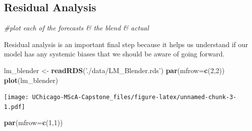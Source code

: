 \documentclass[12pt,oneside]{chicagocapstone}
\newenvironment{Shaded}{\begin{snugshade}}{\end{snugshade}}
\newcommand{\KeywordTok}[1]{\textcolor[rgb]{0.13,0.29,0.53}{\textbf{#1}}}
\newcommand{\DataTypeTok}[1]{\textcolor[rgb]{0.13,0.29,0.53}{#1}}
\newcommand{\DecValTok}[1]{\textcolor[rgb]{0.00,0.00,0.81}{#1}}
\newcommand{\StringTok}[1]{\textcolor[rgb]{0.31,0.60,0.02}{#1}}
\newcommand{\CommentTok}[1]{\textcolor[rgb]{0.56,0.35,0.01}{\textit{#1}}}
\newcommand{\OtherTok}[1]{\textcolor[rgb]{0.56,0.35,0.01}{#1}}
\newcommand{\OperatorTok}[1]{\textcolor[rgb]{0.81,0.36,0.00}{\textbf{#1}}}
\newcommand{\NormalTok}[1]{#1}
\begin{document}
\subsection*{Residual Analysis}\label{findings-Residual-Analysis}
\begin{Shaded}
\begin{Highlighting}[]
\CommentTok{#plot each of the forecasts & the blend & actual}
\end{Highlighting}
\end{Shaded}
Residual analysis is an important final step because it helps us
understand if our model has any systemic biases that we should be aware
of going forward.
\begin{Shaded}
\begin{Highlighting}[]
\NormalTok{lm_blender <-}\StringTok{ }\KeywordTok{readRDS}\NormalTok{(}\StringTok{'./data/LM_Blender.rds'}\NormalTok{)}
\KeywordTok{par}\NormalTok{(}\DataTypeTok{mfrow=}\KeywordTok{c}\NormalTok{(}\DecValTok{2}\NormalTok{,}\DecValTok{2}\NormalTok{))}
\KeywordTok{plot}\NormalTok{(lm_blender)}
\end{Highlighting}
\end{Shaded}
\texttt{[image: UChicago-MScA-Capstone\_files/figure-latex/unnamed-chunk-3-1.pdf]}
\begin{Shaded}
\begin{Highlighting}[]
\KeywordTok{par}\NormalTok{(}\DataTypeTok{mfrow=}\KeywordTok{c}\NormalTok{(}\DecValTok{1}\NormalTok{,}\DecValTok{1}\NormalTok{))}
\end{Highlighting}
\end{Shaded}
\begin{Shaded}
\end{Shaded}
\end{document}
